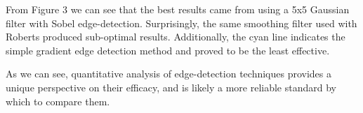 \documentclass[a4paper]{article}
\newenvironment{floatfig}
  {\par\medskip\noindent\minipage{\linewidth}}
  {\endminipage\par\medskip}
\begin{document}
\begin{multicols*}{2}
\begin{floatfig}
{
    }{\columnwidth}

    \vspace{-1em}
    \centering
    \vspace{0.6em}
\end{floatfig}

From Figure 3 we can see that the best results came from using a 5x5 Gaussian filter with Sobel edge-detection. Surprisingly, the same smoothing filter used with Roberts produced sub-optimal results. Additionally, the cyan line indicates the simple gradient edge detection method and proved to be the least effective.

As we can see, quantitative analysis of edge-detection techniques provides a unique perspective on their efficacy, and is likely a more reliable standard by which to compare them.

\vspace{.4em}
\begin{floatfig}
    \centering
\end{floatfig}


\end{multicols*}
\end{document}
